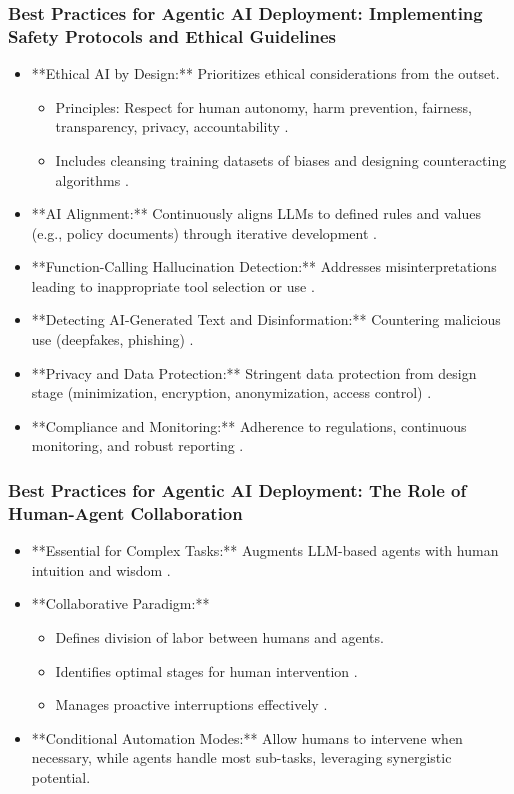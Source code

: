 \documentclass{beamer}       %
\begin{document}
\begin{frame}
    \frametitle{Best Practices for Agentic AI Deployment: Implementing Safety Protocols and Ethical Guidelines}
    \tiny
    \begin{itemize}
        \item **Ethical AI by Design:** Prioritizes ethical considerations from the outset.
        
        \begin{itemize}
            \tiny
            \item Principles: Respect for human autonomy, harm prevention, fairness, transparency, privacy, accountability .
            \item Includes cleansing training datasets of biases and designing counteracting algorithms .
        \end{itemize}
        \item **AI Alignment:** Continuously aligns LLMs to defined rules and values (e.g., policy documents) through iterative development .
        \item **Function-Calling Hallucination Detection:** Addresses misinterpretations leading to inappropriate tool selection or use .
        \item **Detecting AI-Generated Text and Disinformation:** Countering malicious use (deepfakes, phishing) .
        \item **Privacy and Data Protection:** Stringent data protection from design stage (minimization, encryption, anonymization, access control) .
        \item **Compliance and Monitoring:** Adherence to regulations, continuous monitoring, and robust reporting .
    \end{itemize}
\end{frame}

\begin{frame}
    \frametitle{Best Practices for Agentic AI Deployment: The Role of Human-Agent Collaboration}
    \begin{itemize}
        \item **Essential for Complex Tasks:** Augments LLM-based agents with human intuition and wisdom .
        \item **Collaborative Paradigm:**
        \begin{itemize}
            \item Defines division of labor between humans and agents.
            \item Identifies optimal stages for human intervention .
            \item Manages proactive interruptions effectively .
        \end{itemize}
        \item **Conditional Automation Modes:** Allow humans to intervene when necessary, while agents handle most sub-tasks, leveraging synergistic potential.
    \end{itemize}
\end{frame}
\end{document}
